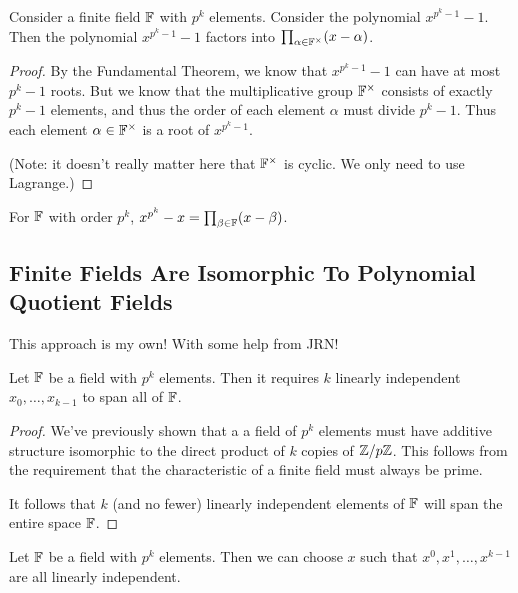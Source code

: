 \begin{proposition}
  Consider a finite field $\mathbb{F}$ with $p^k$ elements. Consider the
  polynomial $x^{p^k - 1} - 1$. Then the polynomial $x^{p^k - 1} - 1$
  factors into $\prod_{\alpha \in \mathbb{F}^\times} \mathopen{}\left( {x - \alpha} \right)\mathclose{}$.
\end{proposition}

\begin{proof}
  By the Fundamental Theorem, we know that $x^{p^k - 1} - 1$ can have at
  most $p^k - 1$ roots. But we know that the multiplicative group
  $\mathbb{F}^\times$ consists of exactly $p^k - 1$ elements, and thus the order
  of each element $\alpha$ must divide $p^k - 1$. Thus each element
  $\alpha \in \mathbb{F}^\times$ is a root of $x^{p^k - 1}$.

  (Note: it doesn't really matter here that $\mathbb{F}^\times$ is cyclic. We
  only need to use Lagrange.)
\end{proof}

\begin{corollary}
  For $\mathbb{F}$ with order $p^k$, $x^{p^k} - x = \prod_{\beta\in\mathbb{F}} \mathopen{}\left( {x
  - \beta} \right)\mathclose{}$.
\end{corollary}

\subsection{Finite Fields Are Isomorphic To Polynomial Quotient Fields}

\begin{remark}
  This approach is my own! With some help from JRN!
\end{remark}

\begin{lemma}
  Let $\mathbb{F}$ be a field with $p^k$ elements. Then it requires $k$ linearly
  independent $x_0, \ldots, x_{k-1}$ to span all of $\mathbb{F}$.
\end{lemma}

\begin{proof}
  We've previously shown that a a field of $p^k$ elements must have
  additive structure isomorphic to the direct product of $k$ copies of
  $\mathbb{Z} / p\mathbb{Z}$. This follows from the requirement that the characteristic of
  a finite field must always be prime.

  It follows that $k$ (and no fewer) linearly independent elements of
  $\mathbb{F}$ will span the entire space $\mathbb{F}$.
\end{proof}

\begin{lemma}
  Let $\mathbb{F}$ be a field with $p^k$ elements. Then we can choose $x$ such
  that $x^0, x^1, \ldots, x^{k-1}$ are all linearly independent.
\end{lemma}

